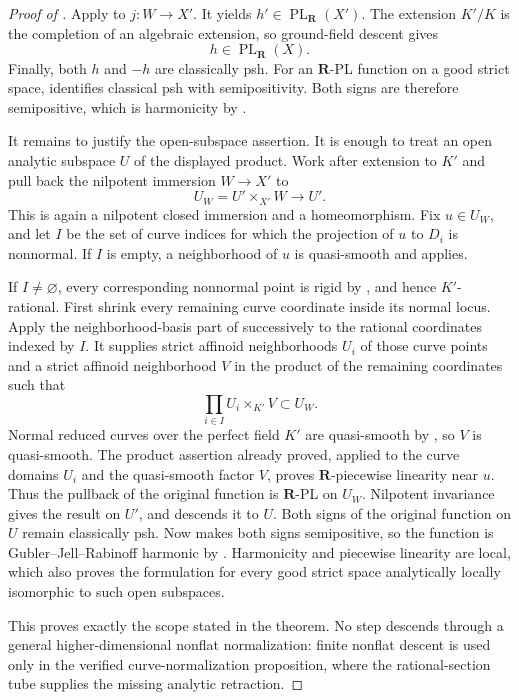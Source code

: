 \begin{proof}[Proof of
]
Apply  to \(j:W\to X'\).
It yields \(h'\in\operatorname{PL}_{\mathbf R}(X')\).  The extension
\(K'/K\) is the completion of an algebraic extension, so ground-field
descent \cite[Corollary~5.12]{GJR26} gives
\[
                         h\in\operatorname{PL}_{\mathbf R}(X).
\]
Finally, both \(h\) and \(-h\) are classically psh.  For an
\(\mathbf R\)-PL function on a good strict space,
\cite[Theorem~4.3]{GR25Classical} identifies classical psh with
semipositivity.  Both signs are therefore semipositive, which is
harmonicity by \cite[Definition~7.2]{GJR26}.

It remains to justify the open-subspace assertion.  It is enough to treat
an open analytic subspace \(U\) of the displayed product.  Work after
extension to \(K'\) and pull back the nilpotent immersion \(W\to X'\) to
\[
                         U_W=U'\times_{X'}W\longrightarrow U'.
\]
This is again a nilpotent closed immersion and a homeomorphism.  Fix
\(u\in U_W\), and let \(I\) be the set of curve indices for which the
projection of \(u\) to \(D_i\) is nonnormal.  If \(I\) is empty, a
neighborhood of \(u\) is quasi-smooth and
 applies.

If \(I\ne\varnothing\), every corresponding nonnormal point is rigid by
\cite[Lemma~3.9(2)]{GR25Classical}, and hence \(K'\)-rational.  First
shrink every remaining curve coordinate inside its normal locus.  Apply
the neighborhood-basis part of
 successively to the rational
coordinates indexed by \(I\).  It supplies strict affinoid neighborhoods
\(U_i\) of those curve points and a strict affinoid neighborhood \(V\) in
the product of the remaining coordinates such that
\[
                         \prod_{i\in I}U_i\times_{K'}V
                         \subset U_W.
\]
Normal reduced curves over the perfect field \(K'\) are quasi-smooth by
\cite[Lemma~3.9(1)]{GR25Classical}, so \(V\) is quasi-smooth.  The product
assertion already proved, applied to the curve domains \(U_i\) and the
quasi-smooth factor \(V\), proves \(\mathbf R\)-piecewise linearity near
\(u\).  Thus the pullback of the original function is \(\mathbf R\)-PL
on \(U_W\).  Nilpotent invariance gives the result on \(U'\), and
\cite[Corollary~5.12]{GJR26} descends it to \(U\).
Both signs of the original function on \(U\) remain classically psh.
Now \cite[Theorem~4.3]{GR25Classical} makes both signs semipositive, so the
function is Gubler--Jell--Rabinoff harmonic by
\cite[Definition~7.2]{GJR26}.  Harmonicity and piecewise linearity are
local, which also proves the formulation for every good strict space
analytically locally isomorphic to such open subspaces.

This proves exactly the scope stated in the theorem.  No step descends
through a general higher-dimensional nonflat normalization: finite
nonflat descent is used only in the verified curve-normalization
proposition, where the rational-section tube supplies the missing analytic
retraction.
\end{proof}
